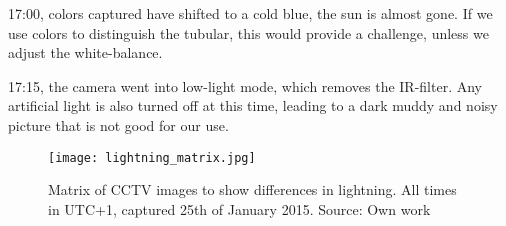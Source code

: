 17:00, colors captured have shifted to a cold blue, the sun is almost gone. If we use colors to distinguish the tubular, this would provide a challenge, unless we adjust the white-balance.

17:15, the camera went into low-light mode, which removes the IR-filter. Any artificial light is also turned off at this time, leading to a dark muddy and noisy picture that is not good for our use.

\begin{figure}[ht]
    \centering
    \texttt{[image: lightning\_matrix.jpg]}
    \caption{Matrix of CCTV images to show differences in lightning. All times in UTC+1, captured 25th of January 2015. Source: Own work}
    \label{fig:lightning_matrix}
\end{figure}
\FloatBarrier



